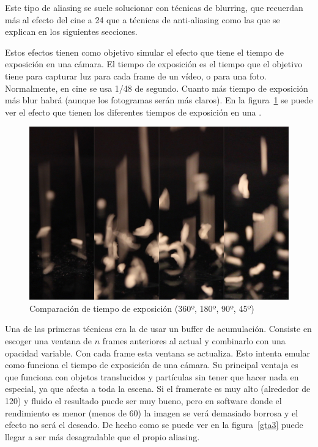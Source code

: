 \documentclass[withindex, glossary]{cam-thesis}
\begin{document}
Este tipo de aliasing se suele solucionar con técnicas de blurring, que recuerdan más al efecto del cine a 24 que a técnicas de anti-aliasing como las que se explican en los siguientes secciones.

Estos efectos tienen como objetivo simular el efecto que tiene el tiempo de exposición en una cámara. El tiempo de exposición es el tiempo que el objetivo tiene para capturar luz para cada frame de un vídeo, o para una foto. Normalmente, en cine se usa 1/48 de segundo\cite{shuttertips}. Cuanto más tiempo de exposición más blur habrá (aunque los fotogramas serán más claros). En la figura~\ref{shutter} se puede ver el efecto que tienen los diferentes tiempos de exposición en una \@.

\begin{figure}[!htbp]
    \includegraphics[width=.8\linewidth]{figures/shutter.jpg}
    \caption{Comparación de tiempo de exposición (360º, 180º, 90º, 45º)\cite{shuttertips}}
    \label{shutter}
\end{figure}

Una de las primeras técnicas era la de usar un buffer de acumulación. Consiste en escoger una ventana de $n$ frames anteriores al actual y combinarlo con una opacidad variable. Con cada frame esta ventana se actualiza. Esto intenta emular como funciona el tiempo de exposición de una cámara. Su principal ventaja es que funciona con objetos translucidos y partículas sin tener que hacer nada en especial, ya que afecta a toda la escena. Si el framerate es muy alto (alrededor de 120) y fluido el resultado puede ser muy bueno, pero en software donde el rendimiento es menor (menos de 60) la imagen se verá demasiado borrosa y el efecto no será el deseado. De hecho como se puede ver en la figura~\ref{gta3} puede llegar a ser más desagradable que el propio aliasing.
\end{document}
